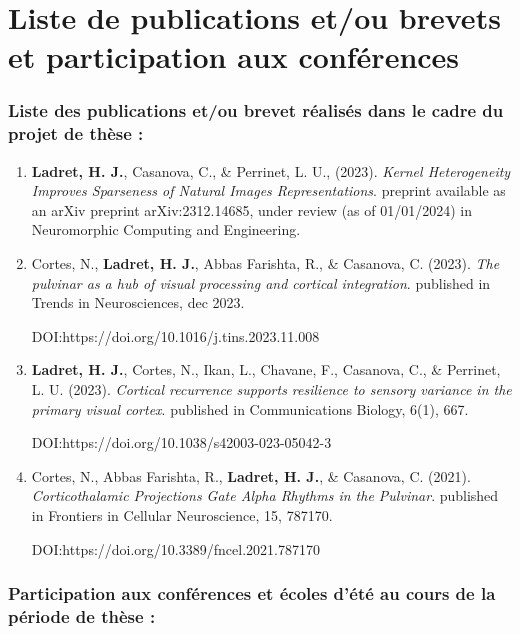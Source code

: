 \newpage
\chapter*{Liste de publications et/ou brevets et participation aux conférences}

\subsection*{Liste des publications et/ou brevet réalisés dans le cadre du projet de thèse :}


\begin{enumerate}
\item \textbf{Ladret, H. J.}, Casanova, C., \& Perrinet, L. U., (2023). \textit{Kernel Heterogeneity Improves Sparseness of Natural Images Representations}. preprint available as an arXiv preprint arXiv:2312.14685, under review (as of 01/01/2024) in Neuromorphic Computing and Engineering.


\item Cortes, N., \textbf{Ladret, H. J.}, Abbas Farishta, R., \& Casanova, C. (2023). \textit{The pulvinar as a hub of visual processing and cortical integration}. published in Trends in Neurosciences, dec 2023. 

DOI:https://doi.org/10.1016/j.tins.2023.11.008


\item \textbf{Ladret, H. J.}, Cortes, N., Ikan, L., Chavane, F., Casanova, C., \& Perrinet, L. U. (2023). \textit{Cortical recurrence supports resilience to sensory variance in the primary visual cortex}. published in Communications Biology, 6(1), 667. 

DOI:https://doi.org/10.1038/s42003-023-05042-3


\item Cortes, N., Abbas Farishta, R., \textbf{Ladret, H. J.}, \& Casanova, C. (2021). \textit{Corticothalamic Projections Gate Alpha Rhythms in the Pulvinar}. published in Frontiers in Cellular Neuroscience, 15, 787170. 

DOI:https://doi.org/10.3389/fncel.2021.787170
\end{enumerate}


\subsection*{Participation aux conférences et écoles d'été au cours de la période de thèse :}

